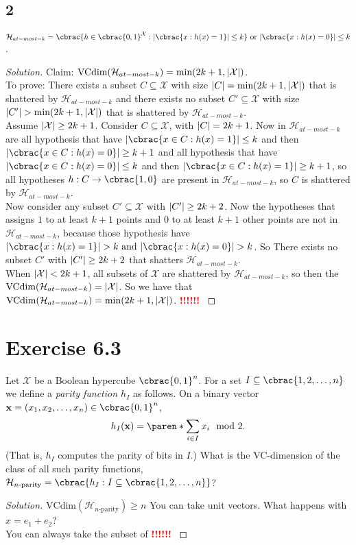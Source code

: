 \documentclass[10pt, a4paper, twoside]{amsart}
\DeclarePairedDelimiter\abs{\lvert}{\rvert}
\DeclarePairedDelimiter\cbrac\{\}
\DeclarePairedDelimiter\paren()
\newcommand{\cH}{\ensuremath{\mathcal{H}}}
\newcommand{\cX}{\ensuremath{\mathcal{X}}}
\newenvironment{solution}
               {\let\oldqedsymbol=\qedsymbol
                \renewcommand{\qedsymbol}{$\blacktriangleleft$}
                \begin{proof}[Solution]}
               {\end{proof}
                \renewcommand{\qedsymbol}{\oldqedsymbol}}
\newcommand{\TODO}{\textcolor{red}{\textbf{!!!!!! }}}
\begin{document}
\subsection*{2}
$\cH_{at-most-k} = \cbrac{h \in \cbrac{0,1}^{\cX}: \abs{\cbrac{x: h(x) = 1}} \leq k} \text{ or }  \abs{\cbrac{x: h(x) = 0}}\leq k$.
\begin{solution}
  Claim: $\text{VCdim}(\cH_{at-most-k}) = \min(2k+1, \abs{\cX})$.\\
  To prove: There exists a subset $C \subseteq \cX$ with size $\abs{C} = \min(2k+1, \abs{\cX})$ that is shattered by $\cH_{at-most-k}$ and there exists no subset $C' \subseteq \cX$ with size $\abs{C'} >  \min(2k+1, \abs{\cX})$ that is shattered by $\cH_{at-most-k}$.\\
  Assume $\abs{\cX} \geq 2k+1$.
  Consider $C \subseteq \cX$, with $\abs{C}=2k+1$. Now in $\cH_{at-most-k}$ are all hypothesis that have $\abs{\cbrac{x \in C: h(x) = 1}} \leq k$ and then $\abs{\cbrac{x \in C: h(x) = 0}} \geq k+1$ and all hypothesis that have $\abs{\cbrac{x \in C: h(x) = 0}} \leq k$ and then $\abs{\cbrac{x \in C: h(x) = 1}} \geq k+1$, so all hypotheses $h: C \to \cbrac{1,0}$ are present in $\cH_{at-most-k}$, so $C$ is shattered by $\cH_{at-most-k}$.\\
  Now consider any subset $C' \subseteq \cX$ with $\abs{C'} \geq 2k+2$. Now the hypotheses that assigns $1$ to at least $k+1$ points and $0$ to at least $k+1$ other points are not in $\cH_{at-most-k}$, because those hypothesis have $\abs{\cbrac{x: h(x) = 1}} > k \text{ and }  \abs{\cbrac{x: h(x) = 0}} > k$. So There exists no subset $C'$ with $\abs{C'} \geq 2k+2$ that shatters $\cH_{at-most-k}$.\\
When $\abs{\cX} < 2k+1$, all subsets of $\cX$ are shattered by $\cH_{at-most-k}$, so then the $\text{VCdim}(\cH_{at-most-k}) = \abs{\cX}$.
So we have that $\text{VCdim}(\cH_{at-most-k}) = \min(2k+1, \abs{\cX})$. 
\TODO
\end{solution}
\section*{Exercise 6.3}
Let $\cX$ be a Boolean hypercube $\cbrac{0,1}^n$. For a set $I \subseteq \cbrac{1,2,\ldots ,n}$ we define a \textit{parity function $h_I$} as follows. On a binary vector $\mathbf{x} = (x_1,x_2,\ldots ,x_n) \in \cbrac{0,1}^n$,
\begin{equation*}
  h_I(\mathbf{x}) = \paren*{\sum_{i \in I}x_i} \mod 2.
\end{equation*}
(That is, $h_I$ computes the parity of bits in $I$.) What is the VC-dimension of the class of all such parity functions, $\cH_{n\text{-parity}} = \cbrac{h_I:I \subseteq \cbrac{1,2, \dots ,n}}$?
\begin{solution}
  $\text{VCdim}(\cH_{n\text{-parity}}) \geq n$ You can take unit vectors. What happens with $x = e_1 +e_2$? \\
  You can always take the subset of 
\TODO
\end{solution}
\end{document}
